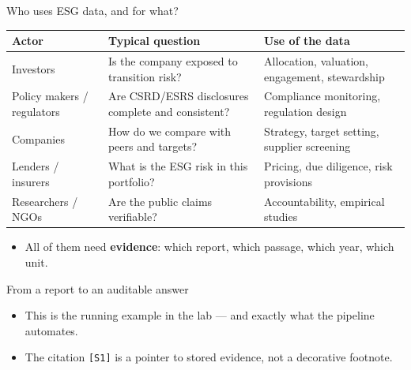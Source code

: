 \documentclass[aspectratio=169]{beamer}
\begin{document}
\begin{frame}{Who uses ESG data, and for what?}
  \small
  \begin{table}
    \centering
    \begin{tabular}{p{}p{}p{}}
    \toprule
    Actor & Typical question & Use of the data \\
    \midrule
    Investors & Is the company exposed to transition risk? & Allocation, valuation, engagement, stewardship \\
    Policy makers / regulators & Are CSRD/ESRS disclosures complete and consistent? & Compliance monitoring, regulation design \\
    Companies & How do we compare with peers and targets? & Strategy, target setting, supplier screening \\
    Lenders / insurers & What is the ESG risk in this portfolio? & Pricing, due diligence, risk provisions \\
    Researchers / NGOs & Are the public claims verifiable? & Accountability, empirical studies \\
    \bottomrule
    \end{tabular}
  \end{table}
  \vspace{2mm}
  \begin{itemize}
    \item All of them need \textbf{evidence}: which report, which passage, which year, which unit.
  \end{itemize}
\end{frame}

\begin{frame}{From a report to an auditable answer}
  \small
  \vspace{2mm}
  \begin{itemize}
    \item This is the running example in the lab --- and exactly what the pipeline automates.
    \item The citation \texttt{[S1]} is a pointer to stored evidence, not a decorative footnote.
  \end{itemize}
\end{frame}
\end{document}
